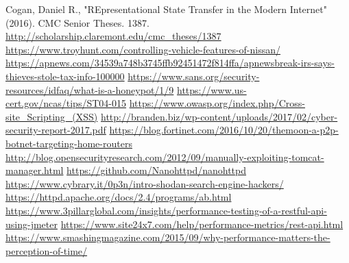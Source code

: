 \documentclass[10pt, conference]{IEEEtran}
\begin{document}
%
%
%
\begin{thebibliography}{1}
Cogan, Daniel R., "REpresentational State Transfer in the Modern Internet" (2016). CMC Senior Theses. 1387. 
\url{http://scholarship.claremont.edu/cmc_theses/1387}
\url{https://www.troyhunt.com/controlling-vehicle-features-of-nissan/}
\url{https://apnews.com/34539a748b3745ffb92451472f814ffa/apnewsbreak-irs-says-thieves-stole-tax-info-100000}
\url{https://www.sans.org/security-resources/idfaq/what-is-a-honeypot/1/9}
\url{https://www.us-cert.gov/ncas/tips/ST04-015}
\url{https://www.owasp.org/index.php/Cross-site_Scripting_(XSS)}
\url{http://branden.biz/wp-content/uploads/2017/02/cyber-security-report-2017.pdf}
\url{https://blog.fortinet.com/2016/10/20/themoon-a-p2p-botnet-targeting-home-routers}
\url{http://blog.opensecurityresearch.com/2012/09/manually-exploiting-tomcat-manager.html}
\url{https://github.com/Nanohttpd/nanohttpd}
\url{https://www.cybrary.it/0p3n/intro-shodan-search-engine-hackers/}
\url{https://httpd.apache.org/docs/2.4/programs/ab.html}
\url{https://www.3pillarglobal.com/insights/performance-testing-of-a-restful-api-using-jmeter}
\url{https://www.site24x7.com/help/performance-metrics/rest-api.html}
\url{https://www.smashingmagazine.com/2015/09/why-performance-matters-the-perception-of-time/}


\end{thebibliography}

% 
\end{document}
